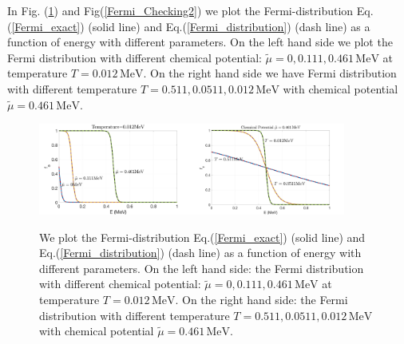 \documentclass[onecolumn,preprintnumbers,amsmath,amssymb]{revtex4}
\begin{document}
In Fig. (\ref{Fermi_Checking}) and Fig(\ref{Fermi_Checking2}) we plot the Fermi-distribution Eq.(\ref{Fermi_exact}) (solid line) and Eq.(\ref{Fermi_distribution}) (dash line) as a function of energy with different parameters. On the left hand side we plot the Fermi distribution with different chemical potential: $\tilde\mu=0, 0.111, 0.461\, \mathrm{MeV}$ at temperature $T=0.012\,\mathrm{MeV}$. On the right hand side we have Fermi distribution with different temperature $T=0.511, 0.0511, 0.012\,\mathrm{MeV}$ with chemical potential $\tilde\mu=0.461\,\mathrm{MeV}$.
\begin{figure}[h]
\begin{center}
\includegraphics[width=0.45\textwidth]{./plot/Fermi_Chemical_Potential}\includegraphics[width=0.45\textwidth]{./plot/FermI_Temperature}
\caption{We plot the Fermi-distribution Eq.(\ref{Fermi_exact}) (solid line) and Eq.(\ref{Fermi_distribution}) (dash line) as a function of energy with different parameters. On the left hand side: the Fermi distribution with different chemical potential: $\tilde\mu=0, 0.111, 0.461\, \mathrm{MeV}$ at temperature $T=0.012\,\mathrm{MeV}$. On the right hand side: the Fermi distribution with different temperature $T=0.511, 0.0511, 0.012\,\mathrm{MeV}$ with chemical potential $\tilde\mu=0.461\,\mathrm{MeV}$.}
\label{Fermi_Checking}
\end{center}
\end{figure}
\end{document}
